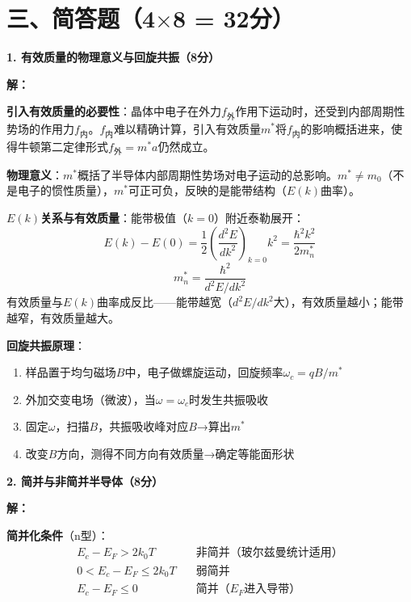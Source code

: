 \documentclass[12pt,a4paper]{ctexart}
\begin{document}
\newpage

\section*{三、简答题（4$\times$8 = 32分）}

\noindent\textbf{1. 有效质量的物理意义与回旋共振（8分）}

\textbf{解：}\quad

\textbf{引入有效质量的必要性}：晶体中电子在外力$f_{\text{外}}$作用下运动时，还受到内部周期性势场的作用力$f_{\text{内}}$。$f_{\text{内}}$难以精确计算，引入有效质量$m^*$将$f_{\text{内}}$的影响概括进来，使得牛顿第二定律形式$f_{\text{外}} = m^*a$仍然成立。

\textbf{物理意义}：$m^*$概括了半导体内部周期性势场对电子运动的总影响。$m^* \neq m_0$（不是电子的惯性质量），$m^*$可正可负，反映的是能带结构（$E(k)$曲率）。

\textbf{$E(k)$关系与有效质量}：能带极值（$k=0$）附近泰勒展开：
\[
E(k) - E(0) = \frac{1}{2}\left(\frac{d^2E}{dk^2}\right)_{k=0} k^2 = \frac{\hbar^2 k^2}{2m_n^*}
\]
\[
\boxed{m_n^* = \frac{\hbar^2}{d^2E/dk^2}}
\]
有效质量与$E(k)$曲率成反比——能带越宽（$d^2E/dk^2$大），有效质量越小；能带越窄，有效质量越大。

\textbf{回旋共振原理}：
\begin{enumerate}[nosep]
\item 样品置于均匀磁场$B$中，电子做螺旋运动，回旋频率$\omega_c = qB/m^*$
\item 外加交变电场（微波），当$\omega = \omega_c$时发生共振吸收
\item 固定$\omega$，扫描$B$，共振吸收峰对应$B$→算出$m^*$
\item 改变$B$方向，测得不同方向有效质量→确定等能面形状
\end{enumerate}

\vspace{1cm}

\noindent\textbf{2. 简并与非简并半导体（8分）}

\textbf{解：}\quad

\textbf{简并化条件}（n型）：
\begin{align*}
E_c - E_F > 2k_0T &\quad \text{非简并（玻尔兹曼统计适用）}\\
0 < E_c - E_F \le 2k_0T &\quad \text{弱简并}\\
E_c - E_F \le 0 &\quad \text{简并（$E_F$进入导带）}
\end{align*}
\end{document}
